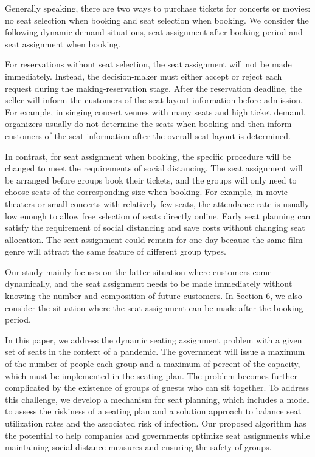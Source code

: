 


Generally speaking, there are two ways to purchase tickets for concerts or movies: no seat selection when booking and seat selection when booking. We consider the following dynamic demand situations, seat assignment after booking period and seat assignment when booking.

For reservations without seat selection, the seat assignment will not be made immediately. Instead, the decision-maker must either accept or reject each request during the making-reservation stage. After the reservation deadline, the seller will inform the customers of the seat layout information before admission. For example, in singing concert venues with many seats and high ticket demand, organizers usually do not determine the seats when booking and then inform customers of the seat information after the overall seat layout is determined.

In contrast, for seat assignment when booking, the specific procedure will be changed to meet the requirements of social distancing. The seat assignment will be arranged before groups book their tickets, and the groups will only need to choose seats of the corresponding size when booking. For example, in movie theaters or small concerts with relatively few seats, the attendance rate is usually low enough to allow free selection of seats directly online. Early seat planning can satisfy the requirement of social distancing and save costs without changing seat allocation. The seat assignment could remain for one day because the same film genre will attract the same feature of different group types.

Our study mainly focuses on the latter situation where customers come dynamically, and the seat assignment needs to be made immediately without knowing the number and composition of future customers. In Section 6, we also consider the situation where the seat assignment can be made after the booking period.


In this paper, we address the dynamic seating assignment problem with a given set of seats in the context of a pandemic. The government will issue a maximum of the number of people each group and a maximum of percent of the capacity, which must be implemented in the seating plan. The problem becomes further complicated by the existence of groups of guests who can sit together. To address this challenge, we develop a mechanism for seat planning, which includes a model to assess the riskiness of a seating plan and a solution approach to balance seat utilization rates and the associated risk of infection. Our proposed algorithm has the potential to help companies and governments optimize seat assignments while maintaining social distance measures and ensuring the safety of groups.



